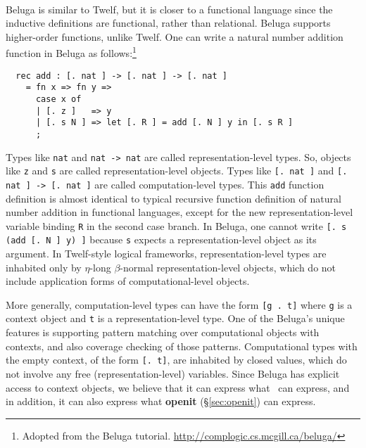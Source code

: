 \paragraph{}
Beluga \cite{Pie10} is similar to Twelf, but it is closer to
a functional language since the inductive definitions are functional,
rather than relational. Beluga supports higher-order functions, unlike Twelf.
One can write a natural number addition function in Beluga 
as follows:\footnote{
        Adopted from the Beluga tutorial.
        \url{http://complogic.cs.mcgill.ca/beluga/} }\vspace*{-2em}
\begin{singlespace}
\begin{verbatim}
  rec add : [. nat ] -> [. nat ] -> [. nat ]
    = fn x => fn y =>
      case x of
      | [. z ]   => y
      | [. s N ] => let [. R ] = add [. N ] y in [. s R ]
      ;
\end{verbatim}
\end{singlespace}\noindent
Types like \verb|nat| and \verb|nat -> nat| are called
representation-level types. So, objects like \verb|z| and \verb|s|
are called representation-level objects. Types like \verb|[. nat ]|
and \verb|[. nat ] -> [. nat ]| are called computation-level types.
This \verb|add| function definition is almost identical to typical
recursive function definition of natural number addition
in functional languages, except for the new representation-level
variable binding \verb|R| in the second case branch. In Beluga,
one cannot write \verb|[. s (add [. N ] y) ]| because \verb|s| expects
a representation-level object as its argument.
In Twelf-style logical frameworks, representation-level types are inhabited
only by $\eta$-long $\beta$-normal representation-level objects, which do not
include application forms of computational-level objects.

More generally, computation-level types can have the form \verb|[g . t]|
where \verb|g| is a context object and \verb|t| is a representation-level type.
One of the Beluga's unique features is supporting pattern matching over
computational objects with contexts, and also coverage checking of those
patterns. Computational types with the empty context, of the form
\verb|[. t]|, are inhabited by closed values, which do not involve
any free (representation-level) variables.
Since Beluga has explicit access to context objects, we believe that
it can express what \MsfIt\ can express, and in addition, it can
also express what \textbf{openit} (\S\ref{sec:openit}) can express.

